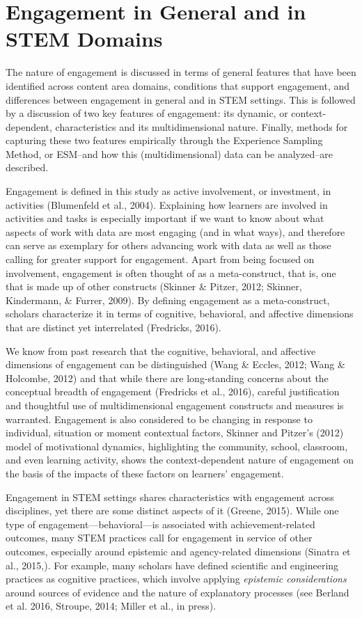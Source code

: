 \documentclass[]{book}
\theoremstyle{definition}
\theoremstyle{definition}
\theoremstyle{definition}
\theoremstyle{remark}
\begin{document}
\section{Engagement in General and in STEM
Domains}\label{engagement-in-general-and-in-stem-domains}

The nature of engagement is discussed in terms of general features that
have been identified across content area domains, conditions that
support engagement, and differences between engagement in general and in
STEM settings. This is followed by a discussion of two key features of
engagement: its dynamic, or context-dependent, characteristics and its
multidimensional nature. Finally, methods for capturing these two
features empirically through the Experience Sampling Method, or ESM--and
how this (multidimensional) data can be analyzed--are described.

Engagement is defined in this study as active involvement, or
investment, in activities (Blumenfeld et al., 2004). Explaining how
learners are involved in activities and tasks is especially important if
we want to know about what aspects of work with data are most engaging
(and in what ways), and therefore can serve as exemplary for others
advancing work with data as well as those calling for greater support
for engagement. Apart from being focused on involvement, engagement is
often thought of as a meta-construct, that is, one that is made up of
other constructs (Skinner \& Pitzer, 2012; Skinner, Kindermann, \&
Furrer, 2009). By defining engagement as a meta-construct, scholars
characterize it in terms of cognitive, behavioral, and affective
dimensions that are distinct yet interrelated (Fredricks, 2016).

We know from past research that the cognitive, behavioral, and affective
dimensions of engagement can be distinguished (Wang \& Eccles, 2012;
Wang \& Holcombe, 2012) and that while there are long-standing concerns
about the conceptual breadth of engagement (Fredricks et al., 2016),
careful justification and thoughtful use of multidimensional engagement
constructs and measures is warranted. Engagement is also considered to
be changing in response to individual, situation or moment contextual
factors, Skinner and Pitzer's (2012) model of motivational dynamics,
highlighting the community, school, classroom, and even learning
activity, shows the context-dependent nature of engagement on the basis
of the impacts of these factors on learners' engagement.

Engagement in STEM settings shares characteristics with engagement
across disciplines, yet there are some distinct aspects of it (Greene,
2015). While one type of engagement---behavioral---is associated with
achievement-related outcomes, many STEM practices call for engagement in
service of other outcomes, especially around epistemic and
agency-related dimensions (Sinatra et al., 2015,). For example, many
scholars have defined scientific and engineering practices as cognitive
practices, which involve applying \emph{epistemic considerations} around
sources of evidence and the nature of explanatory processes (see Berland
et al. 2016, Stroupe, 2014; Miller et al., in press).
\end{document}
